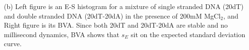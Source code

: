 \label{fig:bva_static}(b) Left figure is an E-S histogram for a mixture of single stranded DNA (20dT) and double stranded DNA (20dT-20dA) in the presence of 200mM MgCl$_2$, and Right figure is its BVA. Since both 20dT and 20dT-20dA are stable and no millisecond dynamics, BVA shows that $s_E$ sit on the expected standard deviation curve.